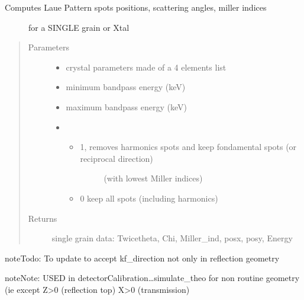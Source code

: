 \documentclass[letterpaper,10pt,english]{sphinxmanual}
\begin{document}
\begin{fulllineitems}
\begin{description}
\item[{Computes Laue Pattern spots positions, scattering angles, miller indices}] \leavevmode
for a SINGLE grain or Xtal

\end{description}
\begin{quote}\begin{description}
\item[{Parameters}] \leavevmode\begin{itemize}
\item {} 
 \textendash{} crystal parameters made of a 4 elements list

\item {} 
 \textendash{} minimum bandpass energy (keV)

\item {} 
 \textendash{} maximum bandpass energy (keV)

\item {} 
 \textendash{} \begin{itemize}
\item {} \begin{description}
\item[{1, removes harmonics spots and keep fondamental spots (or reciprocal direction)}] \leavevmode
(with lowest Miller indices)

\end{description}

\item {} 
0 keep all spots (including harmonics)

\end{itemize}


\end{itemize}

\item[{Returns}] \leavevmode
single grain data: Twicetheta, Chi, Miller\_ind, posx, posy, Energy

\end{description}\end{quote}

\begin{sphinxadmonition}{note}{\label{Simulation_Module:index-2}Todo:}
To update to accept kf\_direction not only in reflection geometry
\end{sphinxadmonition}

\begin{sphinxadmonition}{note}{Note:}
USED in detectorCalibration…simulate\_theo  for non routine geometry (ie except Z\textgreater{}0 (reflection top) X\textgreater{}0 (transmission)
\end{sphinxadmonition}

\end{fulllineitems}
\end{document}
